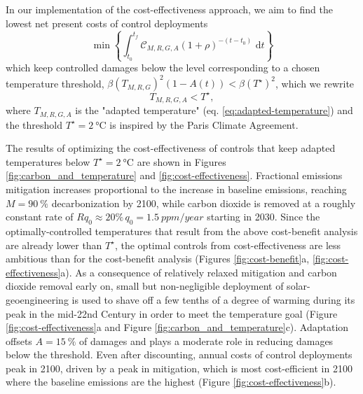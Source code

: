 \documentclass[9pt,twocolumn,twoside,lineno]{pnas-new}
\begin{document}
In our implementation of the cost-effectiveness approach, we aim to find the lowest net present costs of control deployments
\begin{equation}
    \min\left\{\int_{t_{0}}^{t_{f}} \mathcal{C}_{M,R,G,A} (1 + \rho)^{-(t-t_{0})} \text{ d}t\right\}
    \label{eq:net-present-costs}
\end{equation}
which keep controlled damages below the level corresponding to a chosen temperature threshold,
$\beta (T_{M,R,G})^{2} (1 - A(t)) < \beta (T^{\star})^{2}$, which we rewrite
\begin{equation}
    T_{M,R,G,A} < T^{\star},
\end{equation}
where $T_{M,R,G,A}$ is the "adapted temperature" (eq. \ref{eq:adapted-temperature}) and the threshold $T^{\star} = \SI{2}{\celsius}$ is inspired by the Paris Climate Agreement.

The results of optimizing the cost-effectiveness of controls that keep adapted temperatures below $T^{\star} = \SI{2}{\celsius}$ are shown in Figures \ref{fig:carbon_and_temperature} and \ref{fig:cost-effectiveness}. Fractional emissions mitigation increases proportional to the increase in baseline emissions, reaching $M=\SI{90}{\%}$ decarbonization by 2100, while carbon dioxide is removed at a roughly constant rate of $R q_{0} \approx 20\%\, q_{0} = \SI{1.5}{ppm/year}$ starting in 2030. Since the optimally-controlled temperatures that result from the above cost-benefit analysis are already lower than $T^{\star}$, the optimal controls from cost-effectiveness are less ambitious than for the cost-benefit analysis (Figures \ref{fig:cost-benefit}a, \ref{fig:cost-effectiveness}a). As a consequence of relatively relaxed mitigation and carbon dioxide removal early on, small but non-negligible deployment of solar-geoengineering is used to shave off a few tenths of a degree of warming during its peak in the mid-22nd Century in order to meet the temperature goal (Figure \ref{fig:cost-effectiveness}a and Figure \ref{fig:carbon_and_temperature}c). Adaptation offsets $A = \SI{15}{\%}$ of damages and plays a moderate role in reducing damages below the threshold. Even after discounting, annual costs of control deployments peak in 2100, driven by a peak in mitigation, which is most cost-efficient in 2100 where the baseline emissions are the highest (Figure \ref{fig:cost-effectiveness}b).
\end{document}
